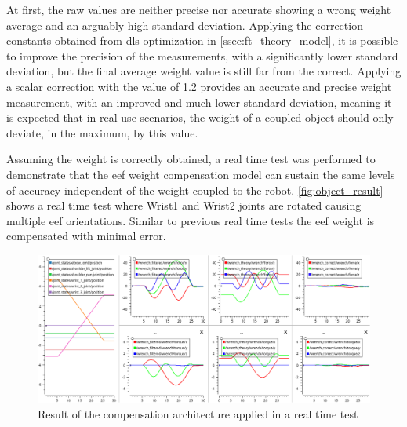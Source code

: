 \par At first, the raw values are neither precise nor accurate showing a wrong weight average and an arguably high standard deviation. Applying the correction constants obtained from \ac{dls} optimization in \autoref{ssec:ft_theory_model}, it is possible to improve the precision of the measurements, with a significantly lower standard deviation, but the final average weight value is still far from the correct. Applying a scalar correction with the value of 1.2 provides an accurate and precise weight measurement, with an improved and much lower standard deviation, meaning it is expected that in real use scenarios, the weight of a coupled object should only deviate, in the maximum, by this value.

\par Assuming the weight is correctly obtained, a real time test was performed to demonstrate that the \ac{eef} weight compensation model can sustain the same levels of accuracy independent of the weight coupled to the robot. \autoref{fig:object_result} shows a real time test where Wrist1 and Wrist2 joints are rotated causing multiple \ac{eef} orientations. Similar to previous real time tests the \ac{eef} weight is compensated with minimal error.

\begin{figure}[h]
    \centering
    \includegraphics[width=0.9\linewidth]{figs/chp6/object_result.png}
    \caption{Result of the compensation architecture applied in a real time test}
    \label{fig:object_result}
\end{figure}

